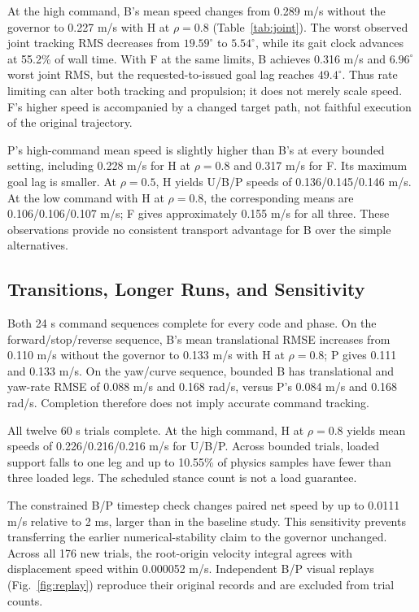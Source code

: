 At the high command, B's mean speed changes from 0.289 m/s without the governor to 0.227 m/s with H at $\rho=0.8$ (Table~\ref{tab:joint}). The worst observed joint tracking RMS decreases from $19.59^\circ$ to $5.54^\circ$, while its gait clock advances at 55.2\% of wall time. With F at the same limits, B achieves 0.316 m/s and $6.96^\circ$ worst joint RMS, but the requested-to-issued goal lag reaches $49.4^\circ$. Thus rate limiting can alter both tracking and propulsion; it does not merely scale speed. F's higher speed is accompanied by a changed target path, not faithful execution of the original trajectory.



P's high-command mean speed is slightly higher than B's at every bounded setting, including 0.228 m/s for H at $\rho=0.8$ and 0.317 m/s for F. Its maximum goal lag is smaller. At $\rho=0.5$, H yields U/B/P speeds of 0.136/0.145/0.146 m/s. At the low command with H at $\rho=0.8$, the corresponding means are 0.106/0.106/0.107 m/s; F gives approximately 0.155 m/s for all three. These observations provide no consistent transport advantage for B over the simple alternatives.

\subsection{Transitions, Longer Runs, and Sensitivity}
Both 24 s command sequences complete for every code and phase. On the forward/stop/reverse sequence, B's mean translational RMSE increases from 0.110 m/s without the governor to 0.133 m/s with H at $\rho=0.8$; P gives 0.111 and 0.133 m/s. On the yaw/curve sequence, bounded B has translational and yaw-rate RMSE of 0.088 m/s and 0.168 rad/s, versus P's 0.084 m/s and 0.168 rad/s. Completion therefore does not imply accurate command tracking.

All twelve 60 s trials complete. At the high command, H at $\rho=0.8$ yields mean speeds of 0.226/0.216/0.216 m/s for U/B/P. Across bounded trials, loaded support falls to one leg and up to 10.55\% of physics samples have fewer than three loaded legs. The scheduled stance count is not a load guarantee.

The constrained B/P timestep check changes paired net speed by up to 0.0111 m/s relative to 2 ms, larger than in the baseline study. This sensitivity prevents transferring the earlier numerical-stability claim to the governor unchanged. Across all 176 new trials, the root-origin velocity integral agrees with displacement speed within 0.000052 m/s. Independent B/P visual replays (Fig.~\ref{fig:replay}) reproduce their original records and are excluded from trial counts.

